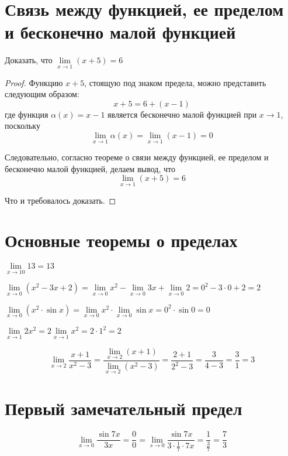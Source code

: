 \documentclass[14pt]{extreport}
\begin{document}
\section{Связь между функцией, ее пределом и бесконечно малой функцией}
\begin{example}Доказать, что $\lim\limits_{x\to1}(x+5)=6$
\begin{proof}
Функцию $x+5$, стоящую под знаком предела, можно представить следующим образом:
$$x+5=6+(x-1)$$
где функция $\alpha(x)=x-1$ является бесконечно малой функцией при $x\rightarrow1$, поскольку 
$$\lim\limits_{x\to1}\alpha(x)=\lim\limits_{x\to1}(x-1)=0$$

Следовательно, согласно теореме о связи между функцией, ее пределом и бесконечно малой функцией, делаем вывод, что 
$$\lim\limits_{x\to 1}(x+5)=6$$

Что и требовалось доказать.

\end{proof}

\end{example}

\section{Основные теоремы о пределах}
\begin{example}
$\lim\limits_{x\to 10}13=13$
\end{example}

\begin{example}
$\lim\limits_{x\to 0}(x^2-3x+2)=\lim\limits_{x\to 0}x^2-\lim\limits_{x\to 0}3x+\lim\limits_{x\to 0}2=0^2-3\cdot0+2=2$	
\end{example}

\begin{example}
$\lim\limits_{x\to 0}(x^2\cdot \sin x)= \lim\limits_{x\to 0}x^2\cdot\lim\limits_{x \to 0}\sin x =0^2\cdot\sin 0=0$
\end{example}

\begin{example}
$\lim\limits_{x\to 1}2x^2=2\lim\limits_{x\to 1}x^2=2\cdot 1^2=2$
\end{example}

\begin{example}
$$\lim\limits_{x\to 2}\frac{x+1}{x^2-3}=\frac{\lim\limits_{x\to 2}(x+1)}{\lim\limits_{x\to 2}(x^2-3)}=\frac{2+1}{2^2-3}=\frac{3}{4-3}=\frac{3}{1}=3$$
\end{example}


\section{Первый замечательный предел}
\begin{example}
 $$\lim\limits_{x\to 0}\frac{\sin7x}{3x}=\frac{0}{0}=\lim\limits_{s\to 0}\frac{\sin7x}{3\cdot\frac{1}{7}\cdot7x}=\frac{1}{\frac{3}{7}}=\frac{7}{3}$$
\end{example}
\end{document}
